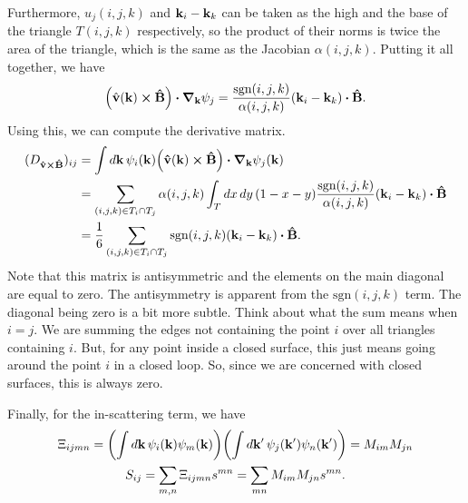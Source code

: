 \documentclass[12pt]{article}
\begin{document}
Furthermore, $u_j(i,j,k)$ and $\vb{k}_i - \vb{k}_k$ can be taken as the high and the base of
the triangle $T(i,j,k)$ respectively, so the product of their norms is twice the area of the
triangle, which is the same as the Jacobian $\alpha(i,j,k)$. Putting it all together, we have
\begin{equation}
    \qty(\hat{\vb{v}}(\vb{k})\cross\vu{B})\vdot\grad_{\vb{k}}\psi_j
    = \frac{\text{sgn}(i,j,k)}{\alpha(i,j,k)}(\vb{k}_i-\vb{k}_k)\vdot\vu{B}.
\end{equation}
Using this, we can compute the derivative matrix.
\begin{align}
    (D_{\vu{v}\cross\vu{B}})_{ij} &= \int\dd{\vb{k}}\psi_i(\vb{k})
    \qty(\vu{v}(\vb{k})\cross\vu{B})\vdot\grad_{\vb{k}}\psi_j(\vb{k}) \\
    &= \sum_{(i,j,k) \in T_i \cap T_j}\alpha(i,j,k) \int_T\dd{x}\dd{y}(1-x-y)
    \frac{\text{sgn}(i,j,k)}{\alpha(i,j,k)}(\vb{k}_i - \vb{k}_k)\vdot\vu{B} \notag \\
    &= \frac{1}{6} \sum_{(i,j,k) \in T_i \cap T_j}\text{sgn}(i,j,k)(\vb{k}_i-\vb{k}_k)\vdot\vu{B}.
    \notag
\end{align}
Note that this matrix is antisymmetric and the elements on the main diagonal are equal to zero.
The antisymmetry is apparent from the $\text{sgn}(i,j,k)$ term. The diagonal being zero is a bit
more subtle. Think about what the sum means when $i=j$. We are summing the edges not containing
the point $i$ over all triangles containing $i$. But, for any point inside a closed surface, this
just means going around the point $i$ in a closed loop. So, since we are concerned with closed
surfaces, this is always zero.

Finally, for the in-scattering term, we have
\begin{gather}
\Xi_{ijmn} = \qty(\int\dd{\vb{k}}\psi_i(\vb{k})\psi_m(\vb{k}))
    \qty(\int\dd{\vb{k'}}\psi_j(\vb{k'})\psi_n(\vb{k'})) = M_{im} M_{jn} \\
S_{ij} = \sum_{m,n}\Xi_{ijmn}s^{mn} = \sum_{mn}M_{im}M_{jn}s^{mn}.
\end{gather}
\end{document}
